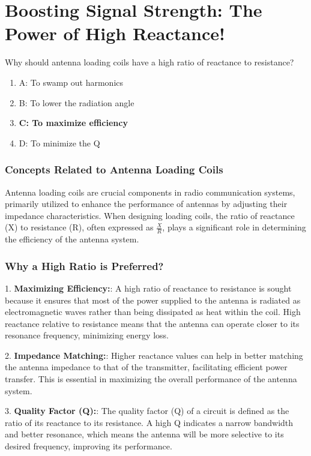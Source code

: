 \section*{Boosting Signal Strength: The Power of High Reactance!}
\begin{tcolorbox}[colback=gray!10, colframe=black, title=E9D04]
Why should antenna loading coils have a high ratio of reactance to resistance?
\begin{enumerate}
    \item A: To swamp out harmonics
    \item B: To lower the radiation angle
    \item \textbf{C: To maximize efficiency}
    \item D: To minimize the Q
\end{enumerate} \end{tcolorbox}

\subsubsection{Concepts Related to Antenna Loading Coils}
Antenna loading coils are crucial components in radio communication systems, primarily utilized to enhance the performance of antennas by adjusting their impedance characteristics. When designing loading coils, the ratio of reactance (X) to resistance (R), often expressed as \( \frac{X}{R} \), plays a significant role in determining the efficiency of the antenna system.

\subsubsection{Why a High Ratio is Preferred?}
1. \textbf{Maximizing Efficiency:}: A high ratio of reactance to resistance is sought because it ensures that most of the power supplied to the antenna is radiated as electromagnetic waves rather than being dissipated as heat within the coil. High reactance relative to resistance means that the antenna can operate closer to its resonance frequency, minimizing energy loss.

2. \textbf{Impedance Matching:}: Higher reactance values can help in better matching the antenna impedance to that of the transmitter, facilitating efficient power transfer. This is essential in maximizing the overall performance of the antenna system.

3. \textbf{Quality Factor (Q):}: The quality factor (Q) of a circuit is defined as the ratio of its reactance to its resistance. A high Q indicates a narrow bandwidth and better resonance, which means the antenna will be more selective to its desired frequency, improving its performance.


